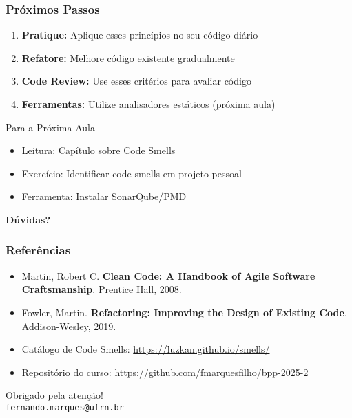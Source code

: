 \documentclass[aspectratio=169]{beamer}
\begin{document}
\begin{frame}
\frametitle{Próximos Passos}

\begin{enumerate}
    \item \textbf{Pratique:} Aplique esses princípios no seu código diário
    \item \textbf{Refatore:} Melhore código existente gradualmente
    \item \textbf{Code Review:} Use esses critérios para avaliar código
    \item \textbf{Ferramentas:} Utilize analisadores estáticos (próxima aula)
\end{enumerate}

\vspace{0.5cm}
\begin{block}{Para a Próxima Aula}
\begin{itemize}
    \item Leitura: Capítulo sobre Code Smells
    \item Exercício: Identificar code smells em projeto pessoal
    \item Ferramenta: Instalar SonarQube/PMD
\end{itemize}
\end{block}

\vspace{0.5cm}
\begin{center}
\textbf{Dúvidas?}
\end{center}
\end{frame}

\begin{frame}
\frametitle{Referências}

\begin{itemize}
    \item Martin, Robert C. \textbf{Clean Code: A Handbook of Agile Software Craftsmanship}. Prentice Hall, 2008.
    \item Fowler, Martin. \textbf{Refactoring: Improving the Design of Existing Code}. Addison-Wesley, 2019.
    \item Catálogo de Code Smells: \url{https://luzkan.github.io/smells/}
    \item Repositório do curso: \url{https://github.com/fmarquesfilho/bpp-2025-2}
\end{itemize}

\vspace{1cm}
\begin{center}
\Large
Obrigado pela atenção!\\
\vspace{0.5cm}
\normalsize
\texttt{fernando.marques@ufrn.br}
\end{center}
\end{frame}
\end{document}
